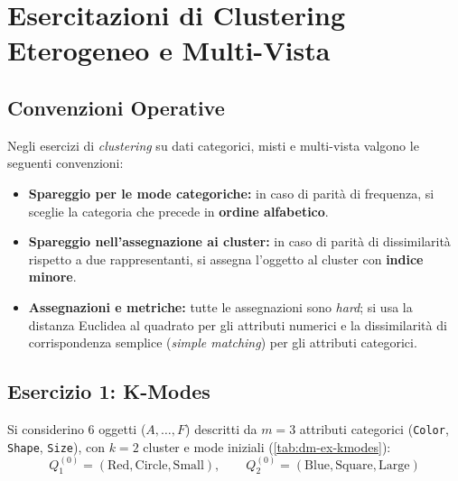 \FloatBarrier
\section{Esercitazioni di Clustering Eterogeneo e Multi-Vista}
\label{ch:dm-ex-heterogeneous-multiview}

\subsection{Convenzioni Operative}
\label{sec:dm-ex-hmv-rules}

Negli esercizi di \textit{clustering} su dati categorici, misti e multi-vista valgono le seguenti convenzioni:
\begin{itemize}
    \item \textbf{Spareggio per le mode categoriche:} in caso di parit\`a di frequenza, si sceglie la categoria che precede in \textbf{ordine alfabetico}.
    \item \textbf{Spareggio nell'assegnazione ai cluster:} in caso di parit\`a di dissimilarit\`a rispetto a due rappresentanti, si assegna l'oggetto al cluster con \textbf{indice minore}.
    \item \textbf{Assegnazioni e metriche:} tutte le assegnazioni sono \textit{hard}; si usa la distanza Euclidea al quadrato per gli attributi numerici e la dissimilarit\`a di corrispondenza semplice (\textit{simple matching}) per gli attributi categorici.
\end{itemize}

\FloatBarrier
\subsection{Esercizio 1: K-Modes}
\label{sec:dm-ex-kmodes}

Si considerino $6$ oggetti ($A, \dots, F$) descritti da $m = 3$ attributi categorici (\texttt{Color}, \texttt{Shape}, \texttt{Size}), con $k = 2$ cluster e mode iniziali (\autoref{tab:dm-ex-kmodes}):
\begin{equation*}
    Q_1^{(0)} = (\text{Red}, \text{Circle}, \text{Small}), \qquad Q_2^{(0)} = (\text{Blue}, \text{Square}, \text{Large})
\end{equation*}

